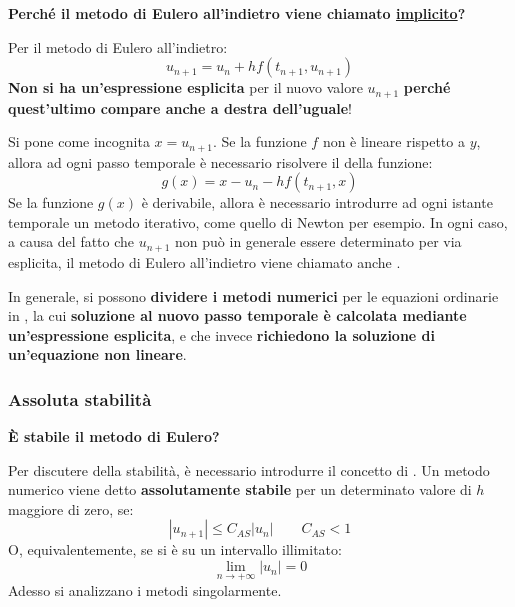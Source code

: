 \highspace
\begin{flushleft}
	\textcolor{Green3}{ \textbf{Perché il metodo di Eulero all'indietro viene chiamato \underline{implicito}?}}
\end{flushleft}
Per il metodo di Eulero all'indietro:
\begin{equation*}
	u_{n+1} = u_{n} + hf\left(t_{n+1}, u_{n+1}\right)
\end{equation*}
\textbf{Non si ha un'espressione esplicita} per il nuovo valore $u_{n+1}$ \textbf{perché quest'ultimo compare anche a destra dell'uguale}!

\highspace
Si pone come incognita $x = u_{n+1}$. Se la funzione $f$ non è lineare rispetto a $y$, allora ad ogni passo temporale è necessario risolvere il  della funzione:
\begin{equation}
	g\left(x\right) = x - u_{n} - hf\left(t_{n+1}, x\right)
\end{equation}
Se la funzione $g\left(x\right)$ è derivabile, allora è necessario introdurre ad ogni istante temporale un metodo iterativo, come quello di Newton per esempio. In ogni caso, a causa del fatto che $u_{n+1}$ non può in generale essere determinato per via esplicita, il metodo di Eulero all'indietro viene chiamato anche .


\highspace
In generale, si possono \textbf{dividere i metodi numerici} per le equazioni ordinarie in , la cui \textbf{soluzione al nuovo passo temporale è calcolata mediante un'espressione esplicita}, e  che invece \textbf{richiedono la soluzione di un'equazione non lineare}.

\newpage

\subsubsection{Assoluta stabilità}

\begin{flushleft}
	\textcolor{Green3}{ \textbf{È stabile il metodo di Eulero?}}
\end{flushleft}
Per discutere della stabilità, è necessario introdurre il concetto di . Un metodo numerico viene detto \textbf{assolutamente stabile} per un determinato valore di $h$ maggiore di zero, se:
\begin{equation}
	\left|u_{n+1}\right| \le C_{AS}\left|u_{n}\right| \hspace{2em} C_{AS} < 1
\end{equation}
O, equivalentemente, se si è su un intervallo illimitato:
\begin{equation*}
	\lim\limits_{n \rightarrow +\infty} \left|u_{n}\right| = 0
\end{equation*}
Adesso si analizzano i metodi singolarmente.

